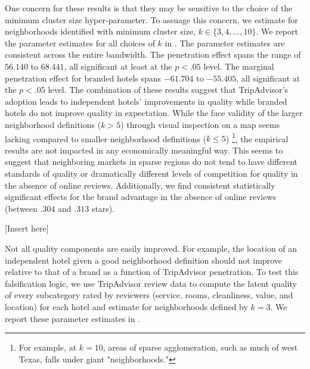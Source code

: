 \documentclass[mksc,blindrev]{informs3} %
\begin{document}
One concern for these results is that they may be sensitive to the choice of the minimum cluster size hyper-parameter. To assuage this concern, we estimate  for neighborhoods identified with minimum cluster size, $k\in\{3,4,...,10\}$. We report the parameter estimates for all choices of $k$ in . The parameter estimates are consistent across the entire bandwidth. The penetration effect spans the range of $56.140$ to $68.441$, all significant at least at the $p<.05$ level. The marginal penetration effect for branded hotels spans $-61.704$ to $-55.405$, all significant at the $p<.05$ level. The combination of these results suggest that TripAdvisor's adoption leads to independent hotels' improvements in quality while branded hotels do not improve quality in expectation. While the face validity of the larger neighborhood definitions ($k>5$) through visual inspection on a map seems lacking compared to smaller neighborhood definitions ($k\le 5$) \footnote{For example, at $k=10$, areas of sparse agglomeration, such as much of west Texas, falls under giant "neighborhoods."}, the empirical results are not impacted in any economically meaningful way. This seems to suggest that neighboring markets in sparse regions do not tend to have different standards of quality or dramatically different levels of competition for quality in the absence of online reviews. Additionally, we find consistent statistically significant effects for the brand advantage in the absence of online reviews (between $.304$ and $.313$ stars). 

[Insert  here]

Not all quality components are easily improved. For example, the location of an independent hotel given a good neighborhood definition should not improve relative to that of a brand as a function of TripAdvisor penetration. To test this falsification logic, we use TripAdvisor review data to compute the latent quality of every subcategory rated by reviewers (service, rooms, cleanliness, value, and location) for each hotel and estimate  for neighborhoods defined by $k=3$. We report these parameter estimates in . 
\end{document}
